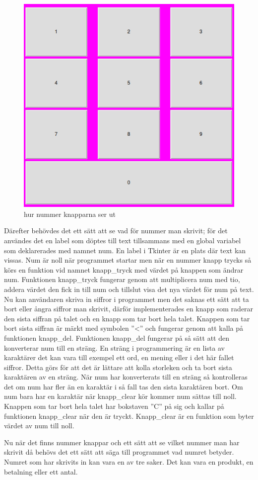 \documentclass[a4paper, 12pt]{article}
\begin{document}
\begin{figure}[h!]
 \centering
  \includegraphics[width=0.5\linewidth]{img/numpad.png}
  \caption{hur nummer knapparna ser ut}
  \label{fig:numpad}
\end{figure}

Därefter behövdes det ett sätt att se vad för nummer man skrivit; för det användes det en label som döptes till text tillsammans med en global variabel som deklarerades med namnet num.
En label i Tkinter är en plats där text kan vissas.
Num är noll när programmet startar men när en nummer knapp trycks så körs en funktion vid namnet knapp\_tryck med värdet på knappen som ändrar num. Funktionen knapp\_tryck fungerar genom att multiplicera num med tio, addera värdet den fick in till num och tillslut visa det nya värdet för num på text. 
Nu kan användaren skriva in siffror i programmet men det saknas ett sätt att ta bort eller ångra siffror man skrivit, därför implementerades en knapp som raderar den sista siffran på talet och en knapp som tar bort hela talet.
Knappen som tar bort sista siffran är märkt med symbolen ''\textless'' och fungerar genom att kalla på funktionen knapp\_del. Funktionen knapp\_del fungerar på så sätt att den konverterar num till en sträng.
En sträng i programmering är en lista av karaktärer det kan vara till exempel ett ord, en mening eller i det här fallet siffror.
Detta görs för att det är lättare att kolla storleken och ta bort sista karaktären av en sträng. 
När num har konverterats till en sträng så kontrolleras det om num har fler än en karaktär i så fall tas den sista karaktären bort. Om num bara har en karaktär när knapp\_clear kör kommer num sättas till noll.
Knappen som tar bort hela talet har bokstaven ''C'' på sig och kallar på funktionen knapp\_clear när den är tryckt. Knapp\_clear är en funktion som byter värdet av num till noll.


Nu när det finns nummer knappar och ett sätt att se vilket nummer man har skrivit då behövs det ett sätt att säga till programmet vad numret betyder. Numret som har skrivits in kan vara en av tre saker. 
Det kan vara en produkt, en betalning eller ett antal.
\end{document}
